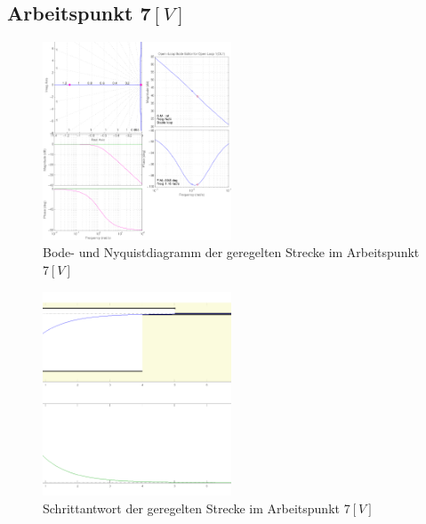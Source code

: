\subsection{Arbeitspunkt 7$\si{[V]}$}
\begin{figure}[h!]
    \centering
    \includegraphics[width=0.5\textwidth]{10/siso_diagramms_g7.pdf}
    \caption{Bode- und Nyquistdiagramm der geregelten Strecke im Arbeitspunkt 7$\si{[V]}$}
    \label{fig:10_diag_7}
\end{figure}
\begin{figure}[h!]
    \centering
    \includegraphics[width=0.5\textwidth]{10/siso_step_g7.pdf}
    \caption{Schrittantwort der geregelten Strecke im Arbeitspunkt 7$\si{[V]}$}
    \label{fig:10_step_7}
\end{figure}


